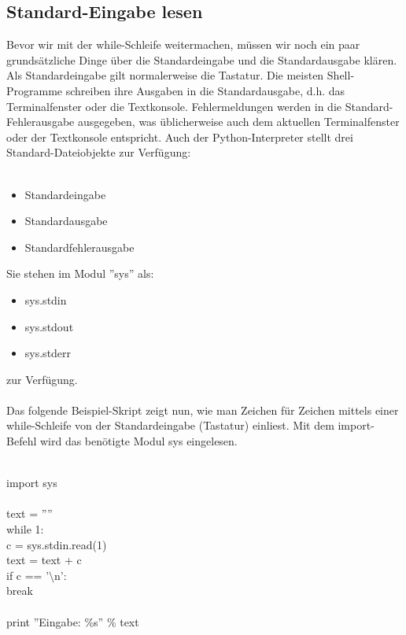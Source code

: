\subsection{Standard-Eingabe lesen}
Bevor wir mit der while-Schleife weitermachen, müssen wir noch ein paar grundsätzliche Dinge über die Standardeingabe und die Standardausgabe klären. Als Standardeingabe gilt normalerweise die Tastatur. Die meisten Shell-Programme schreiben ihre Ausgaben in die Standardausgabe, d.h. das Terminalfenster oder die Textkonsole. Fehlermeldungen werden in die Standard-Fehlerausgabe ausgegeben, was üblicherweise auch dem aktuellen Terminalfenster oder der Textkonsole entspricht.
Auch der Python-Interpreter stellt drei Standard-Dateiobjekte zur Verfügung: \\
\\
\begin{itemize}
\item Standardeingabe 
\item Standardausgabe 
\item Standardfehlerausgabe 
\end{itemize}
Sie stehen im Modul ''sys'' als: \\
\begin{itemize}
\item sys.stdin
\item sys.stdout
\item sys.stderr
\end{itemize}
zur Verfügung.\\
\\
Das folgende Beispiel-Skript zeigt nun, wie man Zeichen für Zeichen mittels einer while-Schleife von der Standardeingabe (Tastatur) einliest. Mit dem import-Befehl wird das benötigte Modul sys eingelesen. \\
\\
\begin{MyConsoleBox}{
import sys \\
\\
text = '''' \\
while 1: \\
\hspace{0.5cm}   c = sys.stdin.read(1) \\
\hspace{0.5cm}   text = text + c \\
\hspace{0.5cm}   if c == '$\setminus$n': \\
\hspace{1.0cm}       break \\
\\
print ''Eingabe: \%s'' \% text \\
}\end{MyConsoleBox}
